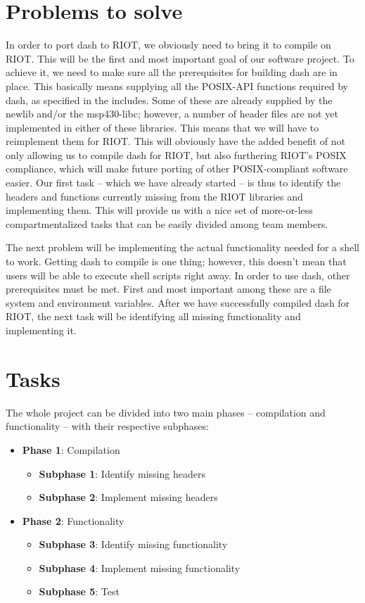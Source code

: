 \documentclass[11pt,
  a4paper,
  BCOR=7mm
]{scrartcl}
\begin{document}
\section*{Problems to solve}
\label{sec:problems}
In order to port dash to RIOT, we obviously need to bring it to compile
on RIOT. This will be the first and most important goal of our software
project. To achieve it, we need to make sure all the prerequisites for
building dash are in place. This basically means supplying all the
POSIX-API functions required by dash, as specified in the includes. Some
of these are already supplied by the newlib and/or the msp430-libc;
however, a number of header files are not yet implemented in either of
these libraries. This means that we will have to reimplement them for
RIOT. This will obviously have the added benefit of not only allowing us
to compile dash for RIOT, but also furthering RIOT's POSIX compliance,
which will make future porting of other POSIX-compliant software easier.
Our first task -- which we have already started -- is thus to identify
the headers and functions currently missing from the RIOT libraries and
implementing them. This will provide us with a nice set of more-or-less
compartmentalized tasks that can be easily divided among team members.

The next problem will be implementing the actual functionality needed for
a shell to work. Getting dash to compile is one thing; however, this
doesn't mean that users will be able to execute shell scripts right
away. In order to use dash, other prerequisites must be met. First and
most important among these are a file system and environment variables.
After we have successfully compiled dash for RIOT, the next task will be
identifying all missing functionality and implementing it.

\section*{Tasks}
\label{sec:tasks}
The whole project can be divided into two main phases -- compilation and
functionality -- with their respective subphases:

\begin{itemize}
  \item \textbf{Phase 1}: Compilation
    \begin{itemize}
      \item \textbf{Subphase 1}: Identify missing headers
      \item \textbf{Subphase 2}: Implement missing headers
    \end{itemize}
  \item \textbf{Phase 2}: Functionality
    \begin{itemize}
      \item \textbf{Subphase 3}: Identify missing functionality
      \item \textbf{Subphase 4}: Implement missing functionality
      \item \textbf{Subphase 5}: Test
    \end{itemize}
\end{itemize}
\end{document}
